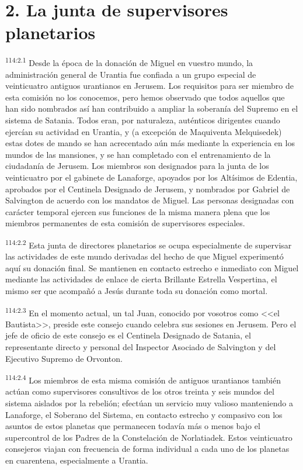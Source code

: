 \section*{2. La junta de supervisores planetarios}
\par
\textsuperscript{114:2.1} Desde la época de la donación de Miguel en vuestro mundo, la administración general de Urantia fue confiada a un grupo especial de veinticuatro antiguos urantianos en Jerusem. Los requisitos para ser miembro de esta comisión no los conocemos, pero hemos observado que todos aquellos que han sido nombrados así han contribuido a ampliar la soberanía del Supremo en el sistema de Satania. Todos eran, por naturaleza, auténticos dirigentes cuando ejercían su actividad en Urantia, y (a excepción de Maquiventa Melquisedek) estas dotes de mando se han acrecentado aún más mediante la experiencia en los mundos de las mansiones, y se han completado con el entrenamiento de la ciudadanía de Jerusem. Los miembros son designados para la junta de los veinticuatro por el gabinete de Lanaforge, apoyados por los Altísimos de Edentia, aprobados por el Centinela Designado de Jerusem, y nombrados por Gabriel de Salvington de acuerdo con los mandatos de Miguel. Las personas designadas con carácter temporal ejercen sus funciones de la misma manera plena que los miembros permanentes de esta comisión de supervisores especiales.

\par
\textsuperscript{114:2.2} Esta junta de directores planetarios se ocupa especialmente de supervisar las actividades de este mundo derivadas del hecho de que Miguel experimentó aquí su donación final. Se mantienen en contacto estrecho e inmediato con Miguel mediante las actividades de enlace de cierta Brillante Estrella Vespertina, el mismo ser que acompañó a Jesús durante toda su donación como mortal.

\par
\textsuperscript{114:2.3} En el momento actual, un tal Juan, conocido por vosotros como <<el Bautista>>, preside este consejo cuando celebra sus sesiones en Jerusem. Pero el jefe de oficio de este consejo es el Centinela Designado de Satania, el representante directo y personal del Inspector Asociado de Salvington y del Ejecutivo Supremo de Orvonton.

\par
\textsuperscript{114:2.4} Los miembros de esta misma comisión de antiguos urantianos también actúan como supervisores consultivos de los otros treinta y seis mundos del sistema aislados por la rebelión; efectúan un servicio muy valioso manteniendo a Lanaforge, el Soberano del Sistema, en contacto estrecho y compasivo con los asuntos de estos planetas que permanecen todavía más o menos bajo el supercontrol de los Padres de la Constelación de Norlatiadek. Estos veinticuatro consejeros viajan con frecuencia de forma individual a cada uno de los planetas en cuarentena, especialmente a Urantia.

